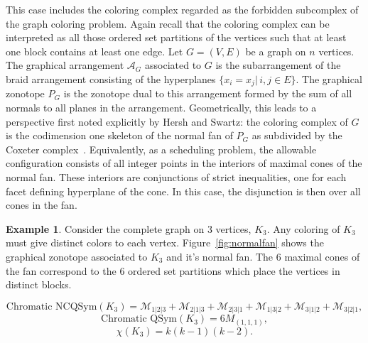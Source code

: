 \documentclass[12pt,reqno]{amsart}
\numberwithin{definition}{section}
\theoremstyle{definition}
\newtheorem{example}[definition]{Example}
\newcommand{\ncM}{\mathcal{M}}
\begin{document}
This case  includes the coloring complex regarded as the forbidden
subcomplex of the graph coloring problem.  Again recall that the
coloring complex can be interpreted as all those ordered set
partitions of the vertices such that at least one block contains at
least one edge.  Let $G=(V,E)$ be a graph on $n$ vertices.  The
graphical arrangement $\mathcal{A}_G$ associated to $G$ is the
subarrangement of the braid arrangement consisting of the hyperplanes
$\{x_i = x_j | \, i,j \in E\}$. The graphical zonotope ${P}_G$ is the
zonotope dual to this arrangement formed by the sum of all normals to
all planes in the arrangement.  Geometrically, this leads to a
perspective first noted explicitly by Hersh and Swartz: the coloring
complex of $G$ is the codimension one skeleton of the normal fan of ${P}_G$
as subdivided by the Coxeter complex~\cite{HS}.  Equivalently, as a scheduling problem,  the
allowable configuration consists of all integer points in the
interiors of maximal cones of the normal fan.  These interiors are
conjunctions of strict inequalities, one for each facet defining
hyperplane of the cone.  In this case, the disjunction is then over
all cones in the fan.

\begin{example}
Consider the complete graph on $3$ vertices, $K_3$.  Any coloring of
$K_3$ must give distinct colors to each vertex.  Figure~\ref{fig:normalfan} shows
the graphical zonotope associated to $K_3$ and it's normal fan.  The
$6$ maximal cones of the fan correspond to the $6$ ordered set
partitions which place the vertices in distinct blocks.

$$\textrm{Chromatic NCQSym}(K_3) = \ncM_{1|2|3} +\ncM_{2|1|3} +\ncM_{2|3|1} +\ncM_{1|3|2} +\ncM_{3|1|2} +\ncM_{3|2|1},$$ 
$$\textrm{Chromatic QSym}(K_3) = 6M_{(1,1,1)},$$
$$\chi(K_3) = k(k-1)(k-2).$$

\end{example}
\end{document}
